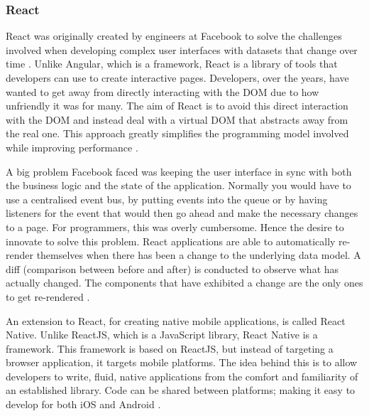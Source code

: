 \subsubsection{React} 
React was originally created by engineers at Facebook to solve the challenges involved when developing complex user interfaces with datasets 
that change over time \cite{gackenheimer2015introduction}. 
Unlike Angular, which is a framework, React is a library of tools that developers can use to create interactive pages.
Developers, over the years, have wanted to get away from directly interacting with the DOM due to how unfriendly it was for many.
The aim of React is to avoid this direct interaction with the DOM and instead deal with a virtual DOM that abstracts away from
the real one. This approach greatly simplifies the programming model involved while improving performance \cite{staff2016react}.

A big problem Facebook faced was keeping the user interface in sync with both the business logic and the state of the application.
Normally you would have to use a centralised event bus, by putting events into the queue or by having listeners for the event that would then go
ahead and make the necessary changes to a page. 
For programmers, this was overly cumbersome. Hence the desire to innovate to solve this problem.
React applications are able to automatically re-render themselves when there has been a change to the underlying data model.
A diff (comparison between before and after) is conducted to observe what has actually changed. The components that have exhibited a change are the
only ones to get re-rendered \cite{staff2016react}.
 
An extension to React, for creating native mobile applications, is called React Native. Unlike ReactJS, which is a JavaScript library,
React Native is a framework. 
This framework is based on ReactJS, but instead of targeting a browser application, it targets mobile platforms.
The idea behind this is to allow developers to write, fluid, native applications from the comfort and familiarity of an established library.
Code can be shared between platforms; making it easy to develop for both iOS and Android \cite{eisenman2015learning}.

